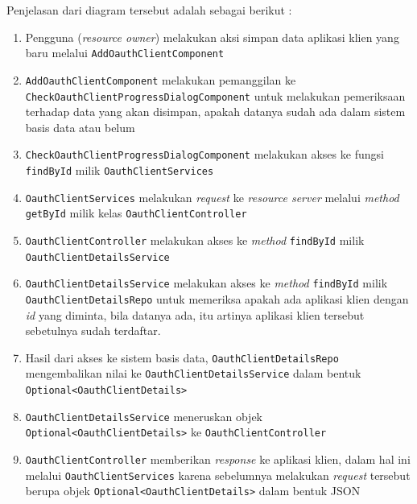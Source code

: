 \documentclass[pdftex,12pt, oneside]{article}
\begin{document}
\begin{itemize}
	Penjelasan dari diagram tersebut adalah sebagai berikut :
	
	\begin{enumerate}
		\item Pengguna (\textit{resource owner}) melakukan aksi simpan data aplikasi klien yang baru melalui \texttt{AddOauthClientComponent}
		
		\item \texttt{AddOauthClientComponent} melakukan pemanggilan ke \texttt{CheckOauthClientProgressDialogComponent} untuk melakukan pemeriksaan terhadap data yang akan disimpan, apakah datanya sudah ada dalam sistem basis data atau belum
		
		\item \texttt{CheckOauthClientProgressDialogComponent} melakukan akses ke fungsi \texttt{findById} milik \texttt{OauthClientServices}
		
		\item \texttt{OauthClientServices} melakukan \textit{request} ke \textit{resource server} melalui \textit{method} \texttt{getById} milik kelas \texttt{OauthClientController}
		
		\item \texttt{OauthClientController} melakukan akses ke \textit{method} \texttt{findById} milik \texttt{OauthClientDetailsService}
		
		\item \texttt{OauthClientDetailsService} melakukan akses ke \textit{method} \texttt{findById} milik \texttt{OauthClientDetailsRepo} untuk memeriksa apakah ada aplikasi klien dengan \textit{id} yang diminta, bila datanya ada, itu artinya aplikasi klien tersebut sebetulnya sudah terdaftar.
		
		\item Hasil dari akses ke sistem basis data, \texttt{OauthClientDetailsRepo} mengembalikan nilai ke \texttt{OauthClientDetailsService} dalam bentuk \texttt{Optional<OauthClientDetails>}
		
		\item \texttt{OauthClientDetailsService} meneruskan objek \texttt{Optional<OauthClientDetails>} ke \texttt{OauthClientController}
		
		\item \texttt{OauthClientController} memberikan \textit{response} ke aplikasi klien, dalam hal ini melalui \texttt{OauthClientServices} karena sebelumnya melakukan \textit{request} tersebut berupa objek \texttt{Optional<OauthClientDetails>} dalam bentuk JSON
		

\end{enumerate}
\end{itemize}
\end{document}
